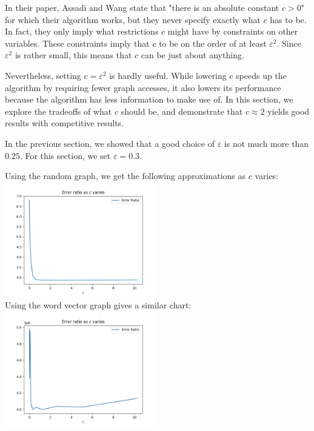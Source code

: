 \documentclass[
]{article}
\begin{document}
In their paper, Assadi and Wang state that "there is an absolute
constant {\(c > 0\)}" for which their algorithm works, but they never
specify exactly what {\(c\)} has to be. In fact, they only imply what
restrictions {\(c\)} might have by constraints on other variables. These
constraints imply that {\(c\)} to be on the order of at least
  {\(\varepsilon^{2}\)}. Since {\(\varepsilon^{2}\)} is rather small, this
means that {\(c\)} can be just about anything.

Nevertheless, setting {\(c = \varepsilon^{2}\)} is hardly useful. While
lowering {\(c\)} speeds up the algorithm by requiring fewer graph
accesses, it also lowers its performance because the algorithm has less
information to make use of. In this section, we explore the tradeoffs of
what {\(c\)} should be, and demonstrate that {\(c \approx 2\)} yields
good results with competitive results.

In the previous section, we showed that a good choice of
  {\(\varepsilon\)} is not much more than {\(0.25\)}. For this section, we
set {\(\varepsilon = 0.3\)}.

Using the random graph, we get the following approximations as {\(c\)}
varies:\\
\includegraphics[width=0.5\textwidth]{images/error_ratio_as_c_varies.png}\\
Using the word vector graph gives a similar chart:\\
\includegraphics[width=0.5\textwidth]{images/error_ratio_as_c_varies_word_vector.png}
\end{document}

